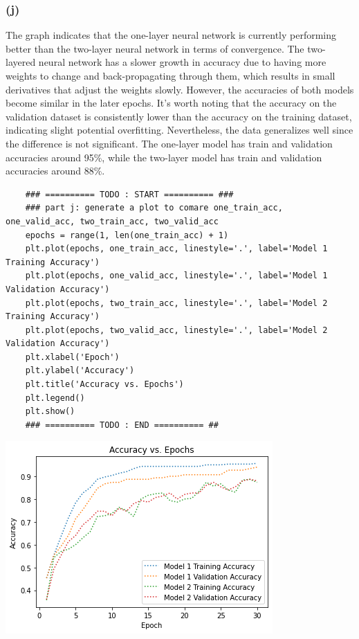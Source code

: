 \documentclass[11pt]{article}
\newcommand{\sol}[1]{{\bf{\color{magenta}{{Solution:}}}}}
\begin{document}
\subsubsection*{(j)}
\sol x The graph indicates that the one-layer neural network is currently performing better than the two-layer neural network in terms of convergence. The two-layered neural network has a slower growth in accuracy due to having more weights to change and back-propagating through them, which results in small derivatives that adjust the weights slowly. However, the accuracies of both models become similar in the later epochs. It's worth noting that the accuracy on the validation dataset is consistently lower than the accuracy on the training dataset, indicating slight potential overfitting. Nevertheless, the data generalizes well since the difference is not significant. The one-layer model has train and validation accuracies around 95\%, while the two-layer model has train and validation accuracies around 88\%. \\

\begin{lstlisting}
    ### ========== TODO : START ========== ###
    ### part j: generate a plot to comare one_train_acc, one_valid_acc, two_train_acc, two_valid_acc
    epochs = range(1, len(one_train_acc) + 1)
    plt.plot(epochs, one_train_acc, linestyle='.', label='Model 1 Training Accuracy')
    plt.plot(epochs, one_valid_acc, linestyle='.', label='Model 1 Validation Accuracy')
    plt.plot(epochs, two_train_acc, linestyle='.', label='Model 2 Training Accuracy')
    plt.plot(epochs, two_valid_acc, linestyle='.', label='Model 2 Validation Accuracy')
    plt.xlabel('Epoch')
    plt.ylabel('Accuracy')
    plt.title('Accuracy vs. Epochs')
    plt.legend()
    plt.show()
    ### ========== TODO : END ========== ##
\end{lstlisting}

\begin{center}
    \includegraphics[scale=0.6]{4j.png} \\
\end{center}
\end{document}
